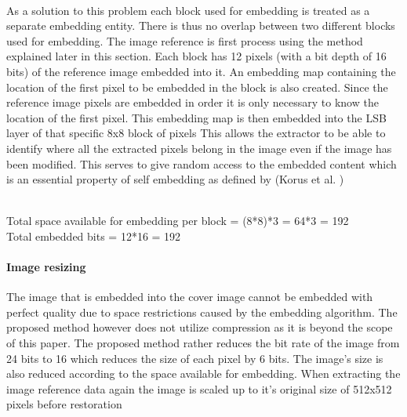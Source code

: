 \documentclass[12pt]{article}
\begin{document}
\hspace{0pt} \\
As a solution to this problem each block used for embedding is treated as a separate embedding entity.
There is thus no overlap between two different blocks used for embedding.
The image reference is first process using the method explained later in this section.
Each block has 12 pixels (with a bit depth of 16 bits) of the reference image embedded into it.
An embedding map containing the location of the first pixel to be embedded in the block is also created.
Since the reference image pixels are embedded in order it is only necessary to know the location of the first pixel.
This embedding map is then embedded into the LSB layer of that specific 8x8 block of pixels 
This allows the extractor to be able to identify where all the extracted pixels belong in the image even if the image has been modified.
This serves to give random access to the embedded content which is an essential property of self embedding as defined by (Korus et al. \cite{korus2013efficient})

\hspace{0pt} \\
Total space available for embedding per block = (8*8)*3 = 64*3 = 192
\hspace{0pt} \\
Total embedded bits = 12*16 = 192

\paragraph{Image resizing}
\label{ImageCompression}
The image that is embedded into the cover image cannot be embedded with perfect quality due to space restrictions caused by the embedding algorithm. 
The proposed method however does not utilize compression as it is beyond the scope of this paper.
The proposed method rather reduces the bit rate of the image from 24 bits to 16 which reduces the size of each pixel by 6 bits.
The image's size is also reduced according to the space available for embedding.
When extracting the image reference data again the image is scaled up to it's original size of 512x512 pixels before restoration
\end{document}
